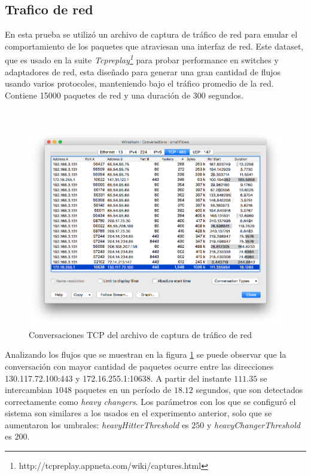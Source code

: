 \documentclass[a4paper,12pt, oneside]{article}
\begin{document}
\subsection{Trafico de red}
En esta prueba se utilizó un archivo de captura de tráfico de red para emular el comportamiento de los paquetes que atraviesan una interfaz de red. Este dataset, que es usado en la suite \textit{Tcpreplay\footnote{http://tcpreplay.appneta.com/wiki/captures.html}} para probar performance en switches y adaptadores de red, esta diseñado para generar una gran cantidad de flujos usando varios protocoles, manteniendo bajo el tráfico promedio de la red. Contiene 15000 paquetes de red y una duración de 300 segundos.

\

\begin{figure}[h!]
	\centering
	\includegraphics[width=.9\textwidth]{graph/smallFlows_conversations.png}
	\caption{Conversaciones TCP del archivo de captura de tráfico de red}
	\label{fig:smallFlows_conversation}
	
\end{figure}

Analizando los flujos que se muestran en la figura \ref{fig:smallFlows_conversation} se puede observar que la conversación con mayor cantidad de paquetes ocurre entre las direcciones 130.117.72.100:443 y 172.16.255.1:10638. A partir del instante $111.35$ se intercambian $1048$ paquetes en un período de $18.12$ segundos, que son detectados correctamente como \textit{heavy changers}. Los parámetros con los que se configuró el sistema son similares a los usados en el experimento anterior, solo que se aumentaron los umbrales: \textit{heavyHitterThreshold} es $250$ y \textit{heavyChangerThreshold} es $200$.
\end{document}
